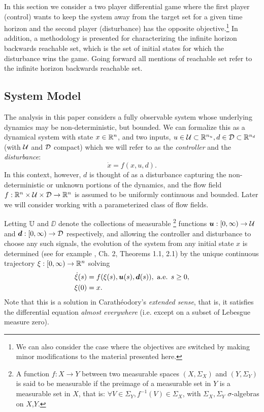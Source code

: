 In this section we consider a two player differential game where the first player (control) wants to keep the system away from the target set for a given time horizon and the second player (disturbance) has the opposite objective.\footnote{We can also consider the case where the objectives are switched by making minor modifications to the material presented here.} In addition, a methodology is presented for characterizing the infinite horizon backwards reachable set, which is the set of initial states for which the disturbance wins the game. Going forward all mentions of reachable set refer to the infinite horizon backwards reachable set.

\subsection{System Model \label{subsec:dynamics}}

The analysis in this paper considers a fully observable system whose underlying dynamics may be non-deterministic, but bounded. 
We can formalize this as a dynamical system with state $x\in\mathbb{R}^n$, and two inputs, $u\in\mathcal{U}\subset\mathbb{R}^{n_u},  d\in\mathcal{D}\subset\mathbb{R}^{n_d}$
(with $\mathcal{U}$ and $\mathcal{D}$ compact)
which we will refer to as the \emph{controller} and the \emph{disturbance}:
\begin{equation}\label{fxud}
\dot{x} = f(x,u, d).
\end{equation}
In this context, however, 
$d$ is thought of as a disturbance capturing the non-deterministic or unknown portions of the dynamics, and the flow field $f: \mathbb{R}^n \times \mathcal{U} \times \mathcal{D}\rightarrow\mathbb{R}^n$ is assumed to be uniformly continuous and bounded. Later we will consider working with a parameterized class of flow fields.

Letting $\mathbb{U} $ and $\DD$ denote the collections of measurable%
	\footnote{A function $f:X\to Y$ between two measurable spaces $(X,\Sigma_X)$ and $(Y,\Sigma_Y)$
	is said to be measurable if the preimage of a measurable set in $Y$ is a measurable set in $X$, that is:
	$\forall V\in\Sigma_Y, f^{-1}(V)\in\Sigma_X$, with $\Sigma_X,\Sigma_Y$ $\sigma$-algebras on $X$,$Y$.}
functions $\bm u: [0,\infty)\to \mathcal{U} $ and $\bm d: [0,\infty)\to \mathcal{D}$ respectively,
and allowing the controller and disturbance to choose any such signals,
the evolution of the system
from any initial state $x$
is determined (see for example \cite{Coddington1955}, Ch. 2, Theorems 1.1, 2.1) by the unique continuous trajectory $\xi:[0,\infty)\to\mathbb{R}^n$ solving
\begin{equation}\label{eq:xdot}
\begin{split}
\dot{\xi}(s) &= f(\xi(s),\bm{u}(s),\bm{d}(s)), \text{ a.e. }s\ge 0,\\
\xi(0) &= x.
\end{split}
\end{equation}
Note that this is a solution in Carath\'eodory's \emph{extended sense}, that is, it satisfies the differential equation \emph{almost everywhere} (i.e. except on a subset of Lebesgue measure zero).


